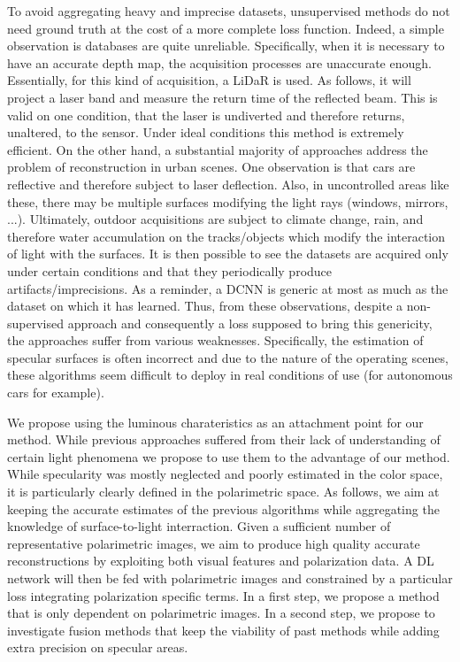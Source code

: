 To avoid aggregating heavy and imprecise datasets, unsupervised methods do not need ground truth at the cost of a more complete loss function. Indeed, a simple observation is databases are quite unreliable. Specifically, when it is necessary to have an accurate depth map, the acquisition processes are unaccurate enough. Essentially, for this kind of acquisition, a LiDaR is used. As follows, it will project a laser band and measure the return time of the reflected beam. This is valid on one condition, that the laser is undiverted and therefore returns, unaltered, to the sensor. Under ideal conditions this method is extremely efficient. On the other hand, a substantial majority of approaches address the problem of reconstruction in urban scenes. One observation is that cars are reflective and therefore subject to laser deflection. Also, in uncontrolled areas like these, there may be multiple surfaces modifying the light rays (windows, mirrors, ...). Ultimately, outdoor acquisitions are subject to climate change, rain, and therefore water accumulation on the tracks/objects which modify the interaction of light with the surfaces. It is then possible to see the datasets are acquired only under certain conditions and that they periodically produce artifacts/imprecisions.
As a reminder, a DCNN is generic at most as much as the dataset on which it has learned. Thus, from these observations, despite a non-supervised approach and consequently a loss supposed to bring this genericity, the approaches suffer from various weaknesses. Specifically, the estimation of specular surfaces is often incorrect and due to the nature of the operating scenes, these algorithms seem difficult to deploy in real conditions of use (for autonomous cars for example).

We propose using the luminous charateristics as an attachment point for our method. While previous approaches suffered from their lack of understanding of certain light phenomena we propose to use them to the advantage of our method. While specularity was mostly neglected and poorly estimated in the color space, it is particularly clearly defined in the polarimetric space. As follows, we aim at keeping the accurate estimates of the previous algorithms while aggregating the knowledge of surface-to-light interraction. Given a sufficient number of representative polarimetric images, we aim to produce high quality accurate reconstructions by exploiting both visual features and polarization data.
A DL network will then be fed with polarimetric images and constrained by a particular loss integrating polarization specific terms. In a first step, we propose a method that is only dependent on polarimetric images. In a second step, we propose to investigate fusion methods that keep the viability of past methods while adding extra precision on specular areas. 


